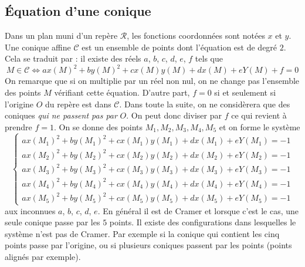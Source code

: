\subsection{\'Equation d'une conique}
Dans un plan muni d'un repère $\mathcal{R}$, les fonctions coordonnées sont notées $x$ et $y$. Une conique affine $\mathcal{C}$ est un ensemble de points dont l'équation est de degré $2$. Cela se traduit par : il existe des réels $a$, $b$, $c$, $d$, $e$, $f$ tels que 
\begin{displaymath}
  M\in \mathcal{C} \Leftrightarrow
  ax(M)^2 +by(M)^2 + cx(M)y(M) + dx(M) + eY(M) +f = 0
\end{displaymath}
On remarque que si on multiplie par un réel non nul, on ne change pas l'ensemble des points $M$ vérifiant cette équation. D'autre part, $f=0$ si et seulement si l'origine $O$ du repère est dans $\mathcal{C}$.\newline
Dans toute la suite, on ne considèrera que des coniques \emph{qui ne passent pas par} $O$. On peut donc diviser par $f$ ce qui revient à prendre $f=1$.\newline
On se donne des points $M_1, M_2, M_3, M_4, M_5$ et on forme le système
\begin{displaymath}
\left\lbrace
\begin{aligned}
  ax(M_1)^2 +by(M_1)^2 + cx(M_1)y(M_1) + dx(M_1) + eY(M_1) = -1 \\
  ax(M_2)^2 +by(M_2)^2 + cx(M_2)y(M_2) + dx(M_2) + eY(M_2) = -1 \\
  ax(M_3)^2 +by(M_3)^2 + cx(M_3)y(M_3) + dx(M_3) + eY(M_3) = -1 \\
  ax(M_4)^2 +by(M_4)^2 + cx(M_4)y(M_4) + dx(M_4) + eY(M_4) = -1 \\
  ax(M_5)^2 +by(M_5)^2 + cx(M_5)y(M_5) + dx(M_5) + eY(M_5) = -1  
\end{aligned}
\right. 
\end{displaymath}
 aux inconnues $a$, $b$, $c$, $d$, $e$.\newline
En général il est de Cramer et lorsque c'est le cas, une seule conique passe par les $5$ points.\newline
Il existe des configurations dans lesquelles le système n'est pas de Cramer. Par exemple si la conique qui contient les cinq points passe par l'origine, ou si plusieurs coniques passent par les points (points alignés par exemple).

